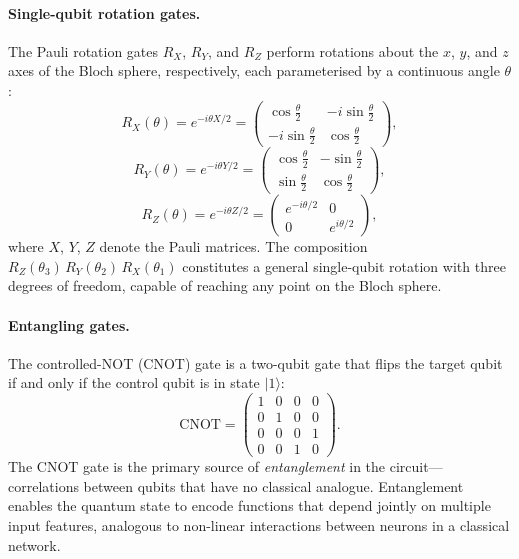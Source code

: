 \paragraph{Single-qubit rotation gates.}
The Pauli rotation gates $R_X$, $R_Y$, and $R_Z$ perform rotations
about the $x$, $y$, and $z$ axes of the Bloch sphere, respectively,
each parameterised by a continuous angle $\theta$:
\begin{equation}
  R_X(\theta) = e^{-i\theta X/2} =
  \begin{pmatrix} \cos\tfrac{\theta}{2} & -i\sin\tfrac{\theta}{2} \\
  -i\sin\tfrac{\theta}{2} & \cos\tfrac{\theta}{2} \end{pmatrix},
\end{equation}
\begin{equation}
  R_Y(\theta) = e^{-i\theta Y/2} =
  \begin{pmatrix} \cos\tfrac{\theta}{2} & -\sin\tfrac{\theta}{2} \\
  \sin\tfrac{\theta}{2} & \cos\tfrac{\theta}{2} \end{pmatrix},
\end{equation}
\begin{equation}
  R_Z(\theta) = e^{-i\theta Z/2} =
  \begin{pmatrix} e^{-i\theta/2} & 0 \\
  0 & e^{i\theta/2} \end{pmatrix},
\end{equation}
where $X$, $Y$, $Z$ denote the Pauli matrices.  The composition
$R_Z(\theta_3)\,R_Y(\theta_2)\,R_X(\theta_1)$ constitutes a general
single-qubit rotation with three degrees of freedom, capable of
reaching any point on the Bloch sphere.

\paragraph{Entangling gates.}
The controlled-NOT (CNOT) gate is a two-qubit gate that flips the
target qubit if and only if the control qubit is in state $|1\rangle$:
\begin{equation}
  \text{CNOT} =
  \begin{pmatrix} 1 & 0 & 0 & 0 \\
                  0 & 1 & 0 & 0 \\
                  0 & 0 & 0 & 1 \\
                  0 & 0 & 1 & 0 \end{pmatrix}.
\end{equation}
The CNOT gate is the primary source of \emph{entanglement} in the
circuit---correlations between qubits that have no classical analogue.
Entanglement enables the quantum state to encode functions that depend
jointly on multiple input features, analogous to non-linear interactions
between neurons in a classical network.

